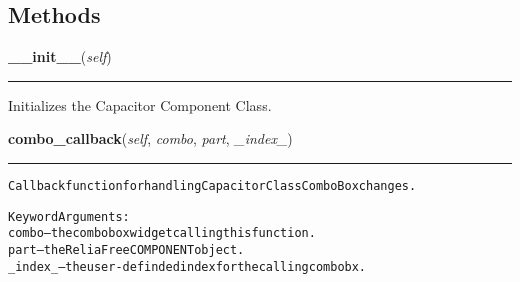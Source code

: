   \subsection{Methods}

    \label{reliafree:capacitors:capacitor:Capacitor:__init__}

    \vspace{0.5ex}

\hspace{.8\funcindent}\begin{boxedminipage}{\funcwidth}

    \raggedright \textbf{\_\_init\_\_}(\textit{self})

    \vspace{-1.5ex}

    \rule{\textwidth}{0.5\fboxrule}
\setlength{\parskip}{2ex}
    Initializes the Capacitor Component Class.

\setlength{\parskip}{1ex}
    \end{boxedminipage}

    \label{reliafree:capacitors:capacitor:Capacitor:combo_callback}

    \vspace{0.5ex}

\hspace{.8\funcindent}\begin{boxedminipage}{\funcwidth}

    \raggedright \textbf{combo\_callback}(\textit{self}, \textit{combo}, \textit{part}, \textit{\_index\_})

    \vspace{-1.5ex}

    \rule{\textwidth}{0.5\fboxrule}
\setlength{\parskip}{2ex}
\begin{alltt}
Callback function for handling Capacitor Class ComboBox changes.

Keyword Arguments:
  combo -- the combobox widget calling this function.
   part -- the ReliaFree COMPONENT object.
\_index\_ -- the user-definded index for the calling combobx.
\end{alltt}

\setlength{\parskip}{1ex}
    \end{boxedminipage}

